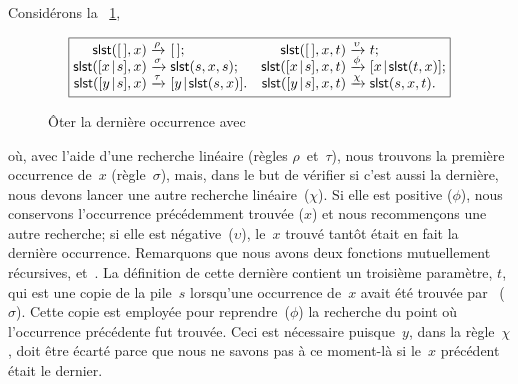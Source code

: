Considérons la \fig~\ref{fig:slst},
\begin{figure}[b]
\begin{equation*}
\boxed{%
\begin{array}{@{}r@{\;}l@{\;}lr@{\;}l@{\;}l@{}}
  \fun{slst}(\el,x)           & \xrightarrow{\smash{\rho}} & \el;
& \fun{slst}(\el,x,t)         & \xrightarrow{\smash{\upsilon}} & t;\\
  \fun{slst}(\cons{x}{s},x)   & \xrightarrow{\smash{\sigma}} &
                                           \fun{slst}(s,x,s);
& \fun{slst}(\cons{x}{s},x,t) & \xrightarrow{\smash{\phi}} &
                                           \cons{x}{\fun{slst}(t,x)};\\
  \fun{slst}(\cons{y}{s},x)   & \xrightarrow{\smash{\tau}} &
                                           \cons{y}{\fun{slst}(s,x)}.
& \fun{slst}(\cons{y}{s},x,t) & \xrightarrow{\smash{\chi}} &
                                           \fun{slst}(s,x,t).
\end{array}}
\end{equation*}
\caption{Ôter la dernière occurrence avec }
\label{fig:slst}
\end{figure}
où, avec l'aide d'une recherche linéaire
(règles \(\rho\)~et~\(\tau\)), nous trouvons la première occurrence
de~\(x\) (règle~\(\sigma\)), mais, dans le but de vérifier si c'est
aussi la dernière, nous devons lancer une autre recherche
linéaire~(\(\chi\)). Si elle est positive (\(\phi\)), nous conservons
l'occurrence précédemment trouvée (\(x\)) et nous recommençons une
autre recherche; si elle est négative~(\(\upsilon\)), le~\(x\) trouvé
tantôt était en fait la dernière occurrence. Remarquons que nous avons
deux fonctions mutuellement récursives,
et~. La définition de cette
dernière contient un troisième paramètre, \(t\), qui est une copie de
la pile~\(s\) lorsqu'une occurrence de~\(x\) avait été trouvée
par~ (\(\sigma\)). Cette copie
est employée pour reprendre~(\(\phi\)) la recherche du point où
l'occurrence précédente fut trouvée. Ceci est nécessaire
puisque~\(y\), dans la règle~\(\chi\), doit être écarté parce que nous
ne savons pas à ce moment-là si le~\(x\) précédent était le dernier.

